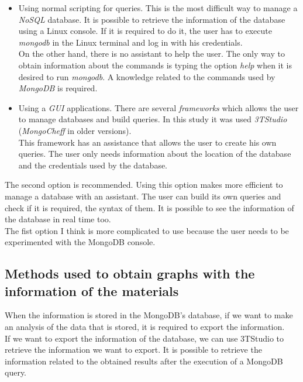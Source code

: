 \begin{itemize}

\item Using normal scripting for queries. This is the most difficult way to manage a \textit{NoSQL} database. It is possible to retrieve the information of the database using a Linux console. If it is required to do it, the user has to execute \textit{mongodb} in the Linux terminal and log in with his credentials.\\

On the other hand, there is no assistant to help the user. The only way to obtain information about the commands is typing the option \textit{help} when it is desired to run \textit{mongodb}. A knowledge related to the commands used by \textit{MongoDB} is required.

\item Using a \textit{GUI} applications. There are several \textit{frameworks} which allows the user to manage databases and build queries. In this study it was used \textit{3TStudio} (\textit{MongoCheff} in older versions).\\

This framework has an assistance that allows the user to create his own queries. The user only needs information about the location of the database and the credentials used by the database.

\end{itemize}

The second option is recommended. Using this option makes more efficient to manage a database with an assistant. The user can build its own queries and check if it is required, the syntax of them. It is possible to see the information of the database in real time too.\\

The fist option I think is more complicated to use because the user needs to be experimented with the MongoDB console.

\subsection{Methods used to obtain graphs with the information of the materials}

When the information is stored in the MongoDB's database, if we want to make an analysis of the data that is stored, it is required to export the information.\\

If we want to export the information of the database, we can use 3TStudio to retrieve the information we want to export. It is possible to retrieve the information related to the obtained results after the execution of a MongoDB query.\\

